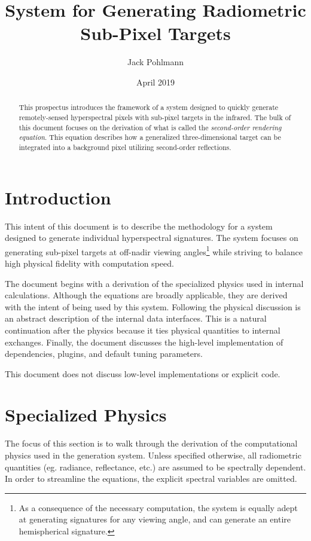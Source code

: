 \documentclass{article}
\title{System for Generating Radiometric Sub-Pixel Targets}
\date{April 2019}
\author{Jack Pohlmann}
\numberwithin{equation}{section}
\begin{document}
\maketitle

\begin{abstract}
    This prospectus introduces the framework of a system designed to quickly generate remotely-sensed
    hyperspectral pixels with sub-pixel targets in the infrared.
    The bulk of this document focuses on the derivation of what is called the
    \textit{second-order rendering equation}.
    This equation describes how a generalized three-dimensional target can be integrated into a background pixel
    utilizing second-order reflections.
\end{abstract}

\section*{Introduction} \label{intro}

    This intent of this document is to describe the methodology for a system designed to generate individual
    hyperspectral signatures.
    The system focuses on generating sub-pixel targets at off-nadir viewing angles\footnote{
        As a consequence of the necessary computation, the system is equally adept at generating signatures for
        any viewing angle, and can generate an entire hemispherical signature.
    } while striving to balance high physical fidelity with computation speed.

    The document begins with a derivation of the specialized physics used in internal calculations.
    Although the equations are broadly applicable, they are derived with the intent of being used by this system.
    Following the physical discussion is an abstract description of the internal data interfaces.
    This is a natural continuation after the physics because it ties physical quantities to internal exchanges.
    Finally, the document discusses the high-level implementation of dependencies, plugins, and default tuning
    parameters.
    
    This document does not discuss low-level implementations or explicit code.

\section{Specialized Physics} \label{phys}

    The focus of this section is to walk through the derivation of the computational physics used in the
    generation system.
    Unless specified otherwise, all radiometric quantities (eg. radiance, reflectance, etc.) are assumed to be
    spectrally dependent.
    In order to streamline the equations, the explicit spectral variables are omitted.
\end{document}
